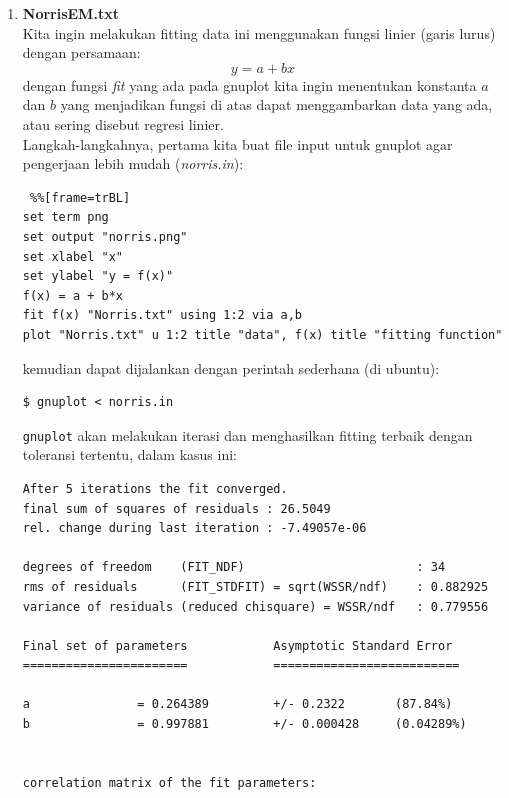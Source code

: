 \documentclass[paper=a4, fontsize=11pt]{scrartcl}
\numberwithin{equation}{section} %
\numberwithin{figure}{section} %
\numberwithin{table}{section} %
\begin{document}
\begin{enumerate}
\item \textbf{NorrisEM.txt}\\
Kita ingin melakukan fitting data ini menggunakan fungsi linier (garis lurus) dengan persamaan:
\begin{equation}
y = a + bx
\end{equation}
dengan fungsi \textit{fit} yang ada pada gnuplot kita ingin menentukan konstanta $a$ dan $b$ yang menjadikan fungsi di atas dapat menggambarkan data yang ada, atau sering disebut regresi linier.\\

Langkah-langkahnya, pertama kita buat file input untuk gnuplot agar pengerjaan lebih mudah (\textit{norris.in}):
\lstset{frameround=fttt}
\begin{lstlisting} %%[frame=trBL]
set term png
set output "norris.png"
set xlabel "x"
set ylabel "y = f(x)"
f(x) = a + b*x
fit f(x) "Norris.txt" using 1:2 via a,b
plot "Norris.txt" u 1:2 title "data", f(x) title "fitting function"
\end{lstlisting}
kemudian dapat dijalankan dengan perintah sederhana (di ubuntu):
\lstset{numbers=none}
\begin{lstlisting}
$ gnuplot < norris.in
\end{lstlisting}
\texttt{gnuplot} akan melakukan iterasi dan menghasilkan fitting terbaik dengan toleransi tertentu, dalam kasus ini:
\begin{small}
\begin{verbatim}
After 5 iterations the fit converged.
final sum of squares of residuals : 26.5049
rel. change during last iteration : -7.49057e-06

degrees of freedom    (FIT_NDF)                        : 34
rms of residuals      (FIT_STDFIT) = sqrt(WSSR/ndf)    : 0.882925
variance of residuals (reduced chisquare) = WSSR/ndf   : 0.779556

Final set of parameters            Asymptotic Standard Error
=======================            ==========================

a               = 0.264389         +/- 0.2322       (87.84%)
b               = 0.997881         +/- 0.000428     (0.04289%)


correlation matrix of the fit parameters:


\end{verbatim}
\end{small}
\end{enumerate}
\end{document}
